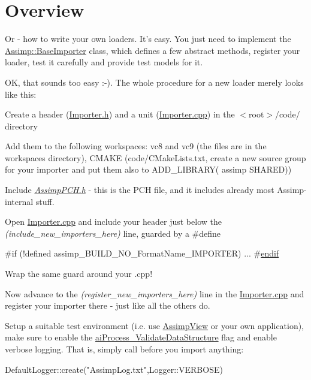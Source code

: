 \hypertarget{extend_General}{}\section{Overview}\label{extend_General}
Or -\/ how to write your own loaders. It's easy. You just need to implement the \hyperlink{class_assimp_1_1_base_importer}{Assimp\+::\+Base\+Importer} class, which defines a few abstract methods, register your loader, test it carefully and provide test models for it.

O\+K, that sounds too easy \+:-\/). The whole procedure for a new loader merely looks like this\+:


\begin{DoxyItemize}
\item Create a header ({\hyperlink{_importer_8h}{Importer.\+h}}) and a unit ({\hyperlink{_importer_8cpp}{Importer.\+cpp}}) in the {\ttfamily $<$root$>$/code/} directory 
\item Add them to the following workspaces\+: vc8 and vc9 (the files are in the workspaces directory), C\+M\+A\+K\+E (code/\+C\+Make\+Lists.\+txt, create a new source group for your importer and put them also to A\+D\+D\+\_\+\+L\+I\+B\+R\+A\+R\+Y( assimp S\+H\+A\+R\+E\+D)) 
\item Include {\itshape \hyperlink{_assimp_p_c_h_8h}{Assimp\+P\+C\+H.\+h}} -\/ this is the P\+C\+H file, and it includes already most Assimp-\/internal stuff.  
\item Open \hyperlink{_importer_8cpp}{Importer.\+cpp} and include your header just below the {\itshape (include\+\_\+new\+\_\+importers\+\_\+here)} line, guarded by a \#define 
\begin{DoxyCode}
\textcolor{preprocessor}{#if (!defined assimp\_BUILD\_NO\_FormatName\_IMPORTER)}
    ...
#\hyperlink{structendif}{endif}
\end{DoxyCode}
 Wrap the same guard around your .cpp!


\item Now advance to the {\itshape (register\+\_\+new\+\_\+importers\+\_\+here)} line in the \hyperlink{_importer_8cpp}{Importer.\+cpp} and register your importer there -\/ just like all the others do. 
\item Setup a suitable test environment (i.\+e. use \hyperlink{namespace_assimp_view}{Assimp\+View} or your own application), make sure to enable the \hyperlink{postprocess_8h_a64795260b95f5a4b3f3dc1be4f52e410ae420ce22fbbac9d0fd21fd92f2b630fa}{ai\+Process\+\_\+\+Validate\+Data\+Structure} flag and enable verbose logging. That is, simply call before you import anything\+: 
\begin{DoxyCode}
DefaultLogger::create(\textcolor{stringliteral}{"AssimpLog.txt"},Logger::VERBOSE)
\end{DoxyCode}
  

\end{DoxyItemize}

